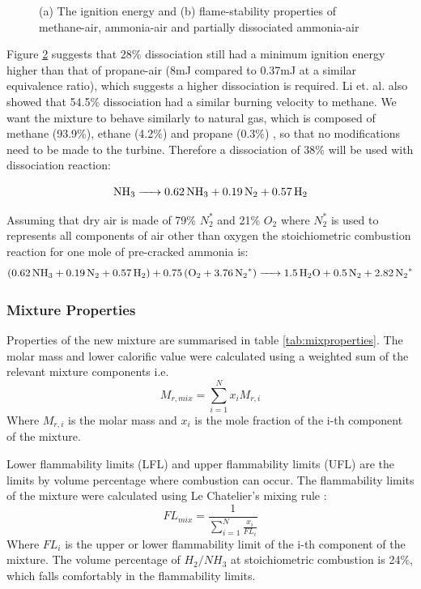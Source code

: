 \documentclass[11pt, oneside]{article}
\begin{document}
\begin{figure} [h]
\begin{subfigure}{.5\textwidth}
  \label{fig:sub2}
\end{subfigure}
\caption{(a) The ignition energy and (b) flame-stability properties of methane-air, ammonia-air and partially dissociated ammonia-air \cite{verkamp}}
\label{fig:mixproperties2}
\end{figure} 

Figure \ref{fig:mixproperties2} suggests that 28\% dissociation still had a minimum ignition energy higher than that of propane-air (8mJ compared to 0.37mJ at a similar equivalence ratio), which suggests a higher dissociation is required. Li et. al. \cite{junLi} also showed that 54.5\% dissociation had a similar burning velocity to methane. We want the mixture to behave similarly to natural gas, which is composed of methane (93.9\%), ethane (4.2\%) and propane (0.3\%) \cite{website:uniongas}, so that no modifications need to be made to the turbine. Therefore a dissociation of 38\% will be used with dissociation reaction:

\begin{equation}
\ce{NH_3 -> 0.62 NH_3 + 0.19 N_2 + 0.57 H_2}
\end{equation}

Assuming that dry air is made of 79\% $N_2^*$ and 21\% $O_2$ where $N_2^*$ is used to represents all components of air other than oxygen the stoichiometric combustion reaction for one mole of pre-cracked ammonia is:
\begin{equation}
\ce{(0.62 NH_3 + 0.19 N_2 + 0.57 H_2) + 0.75(O_2 + 3.76 N_2^*) ->1.5H_2O + 0.5N_2 + 2.82N_2^*}
\end{equation}

\subsubsection {Mixture Properties}
Properties of the new mixture are summarised in table \ref{tab:mixproperties}. The molar mass and lower calorific value were calculated using a weighted sum of the relevant mixture components i.e.
\begin{equation}
M_{r, mix} = \sum_{i=1}^{N} x_i M_{r,i}
\end{equation}
Where $M_{r, i}$ is the molar mass and $x_i$ is the mole fraction of the i-th component of the mixture. 

Lower flammability limits (LFL) and upper flammability limits (UFL) are the limits by volume percentage where combustion can occur. The flammability limits of the mixture were calculated using Le Chatelier's mixing rule \cite{chat}: 
\begin{equation}
FL_{mix} = \frac{1}{\sum_{i=1}^{N} \frac{x_i}{FL_i}}
\end{equation}
Where $FL_{i}$ is the upper or lower flammability limit of the i-th component of the mixture. The volume percentage of $H_2/NH_3$ at stoichiometric combustion is 24\%, which falls comfortably in the flammability limits.
\end{document}
